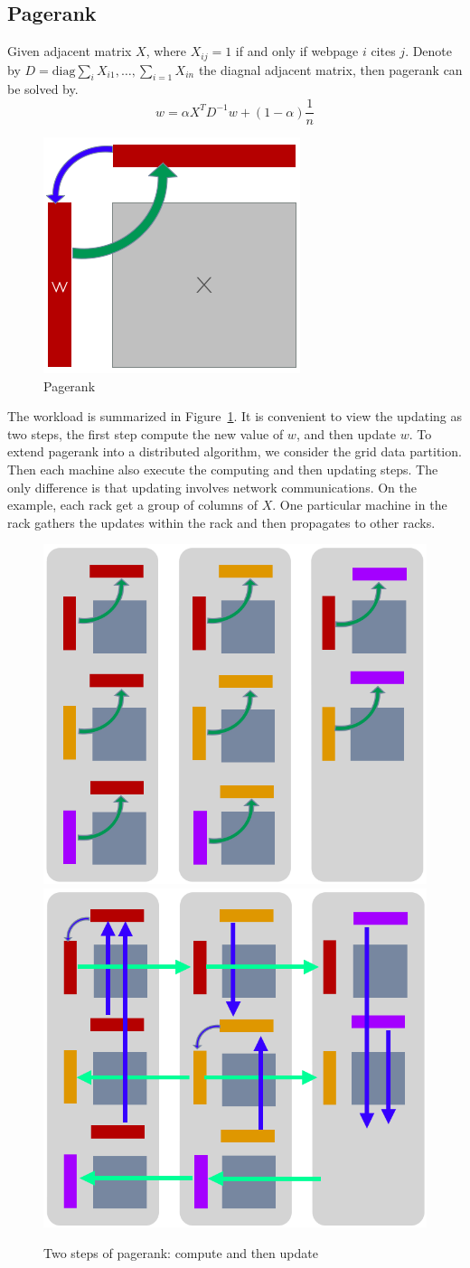 \documentclass{acm_proc_article-sp}
\begin{document}
\subsection{Pagerank}

Given adjacent matrix $X$, where $X_{ij} = 1 $ if and only if webpage $i$ cites
$j$. Denote by $D=\textrm{diag}{\sum_i X_{i1}, \ldots, \sum_{i=1} X_{in}}$ the diagnal
adjacent matrix, then pagerank can be solved by.
\begin{equation}
  w = \alpha X^T D^{-1} w + (1-\alpha)\frac{1}{n}
\end{equation}

\begin{figure}[th!]
  \centering
  \includegraphics[width=.25\textwidth]{fig/pr}
  \caption{Pagerank}
  \label{fig:pr}
\end{figure}

The workload is summarized in Figure~\ref{fig:pr}. It is convenient to view the
updating as two steps, the
first step compute the new value of $w$, and then update $w$. To extend pagerank
into a distributed algorithm, we consider the grid data partition. Then each
machine also execute the computing and then updating steps. The only difference
is that updating involves network communications. On the example, each rack get
a group of columns of $X$. One particular  machine in the rack gathers the
updates within the rack and then propagates to other racks.

\begin{figure}[th!]
  \centering
  \includegraphics[width=.25\textwidth]{fig/compute}
  \includegraphics[width=.25\textwidth]{fig/update}
  \caption{Two steps of pagerank: compute and then update}
\end{figure}
\end{document}
